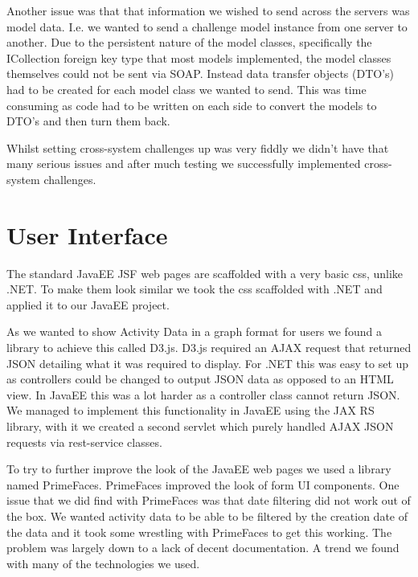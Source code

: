 Another issue was that that information we wished to send across the servers was model data. I.e. we wanted to send a challenge model instance from one server to another. Due to the persistent nature of the model classes, specifically the ICollection foreign key type that most models implemented, the model classes themselves could not be sent via SOAP. Instead data transfer objects (DTO’s) had to be created for each model class we wanted to send. This was time consuming as code had to be written on each side to convert the models to DTO’s and then turn them back. \par
Whilst setting cross-system challenges up was very fiddly we didn’t have that many serious issues and after much testing we successfully implemented cross-system challenges.
\section{User Interface}
The standard JavaEE JSF web pages are scaffolded with a very basic css, unlike .NET. To make them look similar we took the css scaffolded with .NET and applied it to our JavaEE project. \par
As we wanted to show Activity Data in a graph format for users we found a library to achieve this called D3.js\cite{D3.js}. D3.js required an AJAX request that returned JSON detailing what it was required to display. For .NET this was easy to set up as controllers could be changed to output JSON data as opposed to an HTML view. In JavaEE this was a lot harder as a controller class cannot return JSON. We managed to implement this functionality in JavaEE using the JAX RS\cite{JAXRS} library, with it we created a second servlet which purely handled AJAX JSON requests via rest-service classes. \par
To try to further improve the look of the JavaEE web pages we used a library named PrimeFaces. PrimeFaces improved the look of form UI components. One issue that we did find with PrimeFaces was that date filtering did not work out of the box. We wanted activity data to be able to be filtered by the creation date of the data and it took some wrestling with PrimeFaces to get this working. The problem was largely down to a lack of decent documentation. A trend we found with many of the technologies we used.
